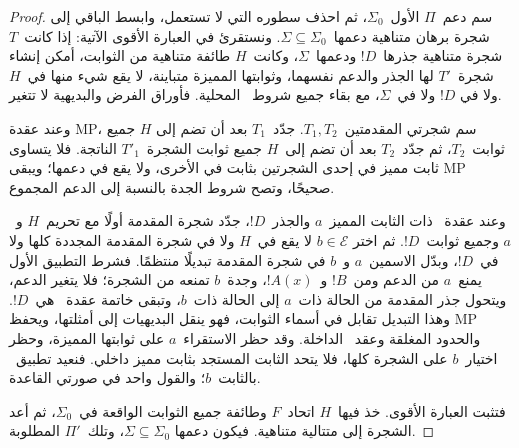 \documentclass[../../../include/open-logic-section]{subfiles}
\begin{document}
\begin{proof}
سم دعم~$\Pi$ الأول~$\Sigma_0$، ثم احذف سطوره التي لا تستعمل، وابسط
الباقي إلى شجرة برهان متناهية دعمها~$\Sigma\subseteq\Sigma_0$.
ونستقرئ في العبارة الأقوى الآتية: إذا كانت~$T$ شجرة متناهية جذرها~$!D$
ودعمها~$\Sigma$، وكانت~$H$ طائفة متناهية من الثوابت، أمكن إنشاء
شجرة~$T'$ لها الجذر والدعم نفسهما، وثوابتها المميزة متباينة، لا يقع شيء منها في~$H$ ولا في
$!D$ ولا في~$\Sigma$، مع بقاء جميع شروط~\QR{} المحلية. فأوراق الفرض
والبديهية لا تتغير.

وعند عقدة MP، سم شجرتي المقدمتين~$T_1,T_2$. جدّد~$T_1$ بعد أن تضم إلى
$H$ جميع ثوابت~$T_2$، ثم جدّد~$T_2$ بعد أن تضم إلى~$H$ جميع ثوابت
الشجرة~$T'_1$ الناتجة. فلا يتساوى ثابت مميز في إحدى الشجرتين بثابت في الأخرى،
ولا يقع في دعمها؛ ويبقى MP صحيحًا، وتصح شروط الجدة بالنسبة إلى الدعم
المجموع.

وعند عقدة~\QR{} ذات الثابت المميز~$a$ والجذر~$!D$، جدّد شجرة المقدمة
أولًا مع تحريم~$H$ و~$a$ وجميع ثوابت~$!D$. ثم اختر
$b\in\mathcal E$ لا يقع في~$H$ ولا في شجرة المقدمة المجددة كلها ولا
في~$!D$، وبدّل الاسمين~$a$ و~$b$ في شجرة المقدمة تبديلًا منتظمًا.
فشرط التطبيق الأول يمنع~$a$ من الدعم ومن~$!B$ و~$!A(x)$، وجدة~$b$
تمنعه من الشجرة؛ فلا يتغير الدعم، ويتحول جذر المقدمة من الحالة ذات~$a$
إلى الحالة ذات~$b$، وتبقى خاتمة عقدة~\QR{} هي~$!D$. وهذا التبديل
تقابل في أسماء الثوابت، فهو ينقل البديهيات إلى أمثلتها، ويحفظ MP والحدود
المغلقة وعقد~\QR{} الداخلة. وقد حظر الاستقراء~$a$ على ثوابتها المميزة،
وحظر اختيار~$b$ على الشجرة كلها، فلا يتحد الثابت المستجد بثابت مميز داخلي.
فنعيد تطبيق~\QR{} بالثابت~$b$؛ والقول واحد في صورتي القاعدة.

فتثبت العبارة الأقوى. خذ فيها~$H$ اتحاد~$F$ وطائفة جميع الثوابت الواقعة
في~$\Sigma_0$، ثم أعد الشجرة إلى متتالية متناهية. فيكون دعمها
$\Sigma\subseteq\Sigma_0$، وتلك~$\Pi'$ المطلوبة.
\end{proof}
\end{document}
